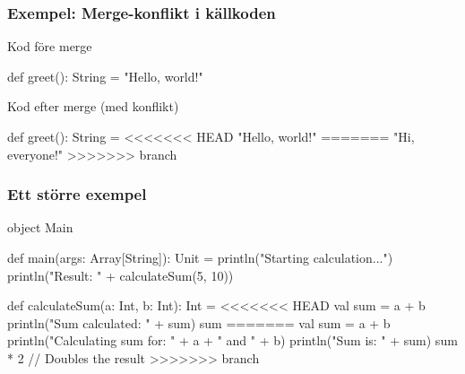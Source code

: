 \begin{frame}[fragile]
    \frametitle{Exempel: Merge-konflikt i källkoden}

    \begin{block}{\small Kod före merge}
        \begin{GobbleCode}[0pt]{10}
            def greet(): String = {
                "Hello, world!"
            }
        \end{GobbleCode}
    \end{block}

    \begin{block}{\small Kod efter merge (med konflikt)}
        \begin{GobbleCode}[0pt]{10}
            def greet(): String = {
            <<<<<<< HEAD
                "Hello, world!"
            =======
                "Hi, everyone!"
            >>>>>>> branch
            }
        \end{GobbleCode}
    \end{block}

    \begin{itemize}
    \end{itemize}

\end{frame}


\begin{frame}[fragile]
    \frametitle{Ett större exempel}

    \begin{GobbleCode}[2pt]{6}
        object Main {
            def main(args: Array[String]): Unit = {
                println("Starting calculation...")
                println("Result: " + calculateSum(5, 10))
            }

            def calculateSum(a: Int, b: Int): Int = {
        <<<<<<< HEAD
                val sum = a + b
                println("Sum calculated: " + sum)
                sum
        =======
                val sum = a + b
                println("Calculating sum for: " + a + " and " + b)
                println("Sum is: " + sum)
                sum * 2 // Doubles the result
        >>>>>>> branch
            }
        }
    \end{GobbleCode}

\end{frame}

